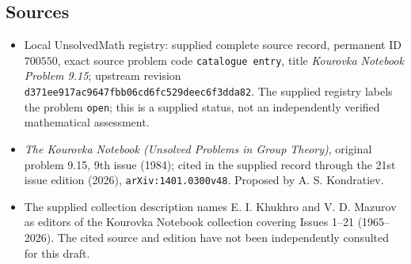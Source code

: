 \documentclass[11pt]{article}
\begin{document}
\subsection{Sources}
\begin{itemize}
\item Local UnsolvedMath registry: supplied complete source record, permanent ID \(700550\), exact source problem code \texttt{catalogue entry}, title \emph{Kourovka Notebook Problem 9.15}; upstream revision \texttt{d371ee917ac9647fbb06cd6fc529deec6f3dda82}. The supplied registry labels the problem \texttt{open}; this is a supplied status, not an independently verified mathematical assessment.
\item \emph{The Kourovka Notebook (Unsolved Problems in Group Theory)}, original problem 9.15, 9th issue (1984); cited in the supplied record through the 21st issue edition (2026), \texttt{arXiv:1401.0300v48}. Proposed by A. S. Kondratiev.
\item The supplied collection description names E. I. Khukhro and V. D. Mazurov as editors of the Kourovka Notebook collection covering Issues 1--21 (1965--2026). The cited source and edition have not been independently consulted for this draft.
\end{itemize}
\end{document}
